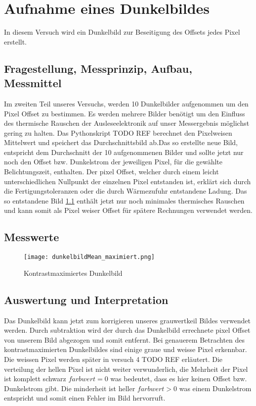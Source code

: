 %
%
\chapter{Aufnahme eines Dunkelbildes}
In diesem Versuch wird ein Dunkelbild zur Beseitigung des Offsets jedes Pixel erstellt.
\label{chap:Aufnahme_eines_Dunkelbildes}

\section{Fragestellung, Messprinzip, Aufbau, Messmittel}
Im zweiten Teil unseres Versuchs, werden 10 Dunkelbilder aufgenommen um den Pixel Offset zu bestimmen. Es werden mehrere Bilder benötigt um den Einfluss des thermische Rauschen der Ausleseelektronik auf unser Messergebnis möglichst gering zu halten. Das Pythonskript TODO REF berechnet den Pixelweisen Mittelwert und speichert das Durchschnittsbild ab.Das so erstellte neue Bild,  entspricht dem Durchschnitt der 10 aufgenommenen Bilder und sollte jetzt nur noch den Offset bzw. Dunkelstrom der jeweiligen Pixel, für die gewählte Belichtungszeit, enthalten. Der pixel Offset, welcher durch einem leicht unterschiedlichen Nullpunkt der einzelnen Pixel entstanden ist, erklärt sich durch die Fertigungstoleranzen oder die durch Wärmezufuhr entstandene Ladung. Das so entstandene Bild \ref{img:dunkelbild_kontrastmax} enthält jetzt nur noch minimales thermisches Rauschen und kann somit als Pixel weiser Offset für spätere Rechnungen verwendet werden.
\label{chap:VERSUCH_2_FRAGESTELLUNG}

\section{Messwerte}
\begin{figure}[H]
\centering
\texttt{[image: dunkelbildMean\_maximiert.png]}
\caption{Kontrastmaximiertes Dunkelbild}
\label{img:dunkelbild_kontrastmax}
\end{figure}
\label{chap:VERSUCH_2_MESSWERTE}

\section{Auswertung und Interpretation}
Das Dunkelbild kann jetzt zum korrigieren unseres grauwertkeil Bildes verwendet werden. Durch subtraktion wird der durch das Dunkelbild errechnete pixel Offset von unserem Bild abgezogen und somit entfernt.
Bei genauerem Betrachten des kontrastmaximierten Dunkelbildes sind einige graue und weisse Pixel erkennbar. Die weissen Pixel werden später in versuch 4 TODO REF erläutert.
Die verteilung der hellen Pixel ist nicht weiter verwunderlich, die Mehrheit der Pixel ist komplett schwarz $farbwert = 0$ was bedeutet, dass es hier keinen Offset bzw. Dunkelstrom gibt. Die minderheit ist heller $farbwert > 0$ was einem Dunkelstrom entspricht und somit einen Fehler im Bild hervorruft.
\label{chap:VERSUCH_2_AUSWERTUNG}